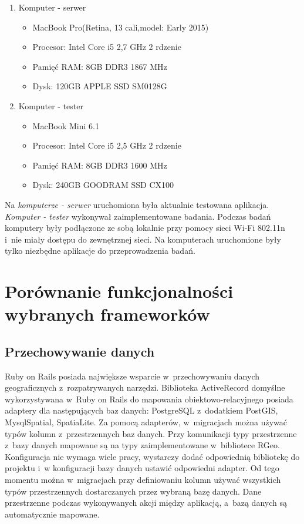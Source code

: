 \documentclass[printmode]{mgr}
\begin{document}
\begin{enumerate}
\item Komputer - serwer
  \begin{itemize}
    \item MacBook Pro(Retina, 13 cali,model: Early 2015)
    \item Procesor: Intel Core i5 2,7 GHz 2 rdzenie
    \item Pamięć RAM: 8GB DDR3 1867 MHz
    \item Dysk: 120GB APPLE SSD SM0128G
  \end{itemize}
\item Komputer - tester
  \begin{itemize}
    \item MacBook Mini 6.1
    \item Procesor: Intel Core i5 2,5 GHz 2 rdzenie
    \item Pamięć RAM: 8GB DDR3 1600 MHz
    \item Dysk: 240GB GOODRAM SSD CX100
  \end{itemize}
\end{enumerate}

Na \textit{komputerze - serwer} uruchomiona była aktualnie testowana aplikacja. \textit{Komputer - tester} wykonywał zaimplementowane badania. Podczas badań komputery były podłączone ze sobą lokalnie przy pomocy sieci Wi-Fi 802.11n i~nie miały dostępu do zewnętrznej sieci. Na komputerach uruchomione były tylko niezbędne aplikacje do przeprowadzenia badań.

\section{Porównanie funkcjonalności wybranych frameworków}

\subsection{Przechowywanie danych}

 Ruby on Rails posiada największe wsparcie w~przechowywaniu danych geograficznych z~rozpatrywanych narzędzi. Biblioteka ActiveRecord domyślne wykorzystywana w~Ruby on Rails do mapowania obiektowo-relacyjnego posiada adaptery dla następujących baz danych: PostgreSQL z~dodatkiem PostGIS, MysqlSpatial, SpatiaLite. Za pomocą adapterów, w~migracjach można używać typów kolumn z~przestrzennych baz danych. Przy komunikacji typy przestrzenne z~bazy danych mapowane są na typy zaimplementowane w~bibliotece RGeo. Konfiguracja nie wymaga wiele pracy, wystarczy dodać odpowiednią bibliotekę do projektu i~w konfiguracji bazy danych ustawić odpowiedni adapter. Od tego momentu można w~migracjach przy definiowaniu kolumn używać wszystkich typów przestrzennych dostarczanych przez wybraną bazę danych. Dane przestrzenne podczas wykonywanych akcji między aplikacją, a~bazą danych są automatycznie mapowane.
\end{document}
